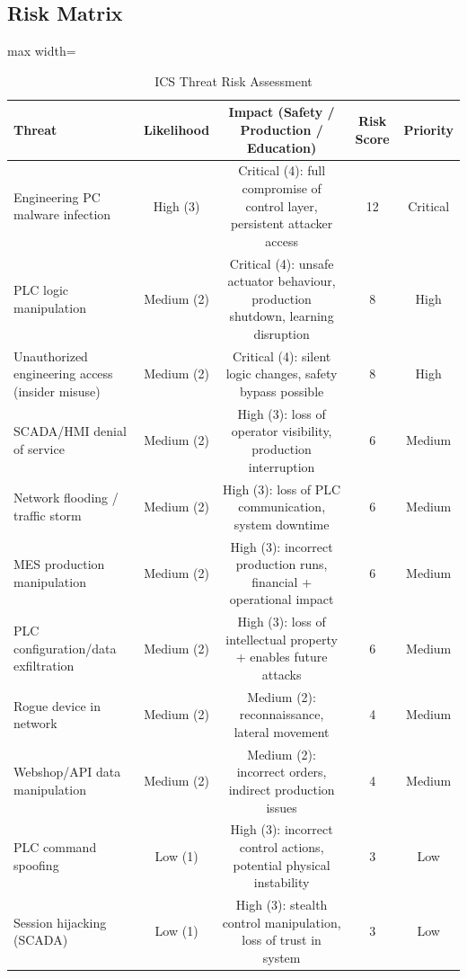 \subsection{Risk Matrix}

\begin{table}[H]
\centering

\begin{adjustbox}{max width=\textwidth}
\begin{tabular}{@{}lcccc@{}}
\toprule
\textbf{Threat} & \textbf{Likelihood} & \textbf{Impact (Safety / Production / Education)} & \textbf{Risk Score} & \textbf{Priority} \\
\midrule
Engineering PC malware infection & High (3) & Critical (4): full compromise of control layer, persistent attacker access & 12 & Critical \\
PLC logic manipulation & Medium (2) & Critical (4): unsafe actuator behaviour, production shutdown, learning disruption & 8 & High \\
Unauthorized engineering access (insider misuse) & Medium (2) & Critical (4): silent logic changes, safety bypass possible & 8 & High \\
SCADA/HMI denial of service & Medium (2) & High (3): loss of operator visibility, production interruption & 6 & Medium \\
Network flooding / traffic storm & Medium (2) & High (3): loss of PLC communication, system downtime & 6 & Medium \\
MES production manipulation & Medium (2) & High (3): incorrect production runs, financial + operational impact & 6 & Medium \\
PLC configuration/data exfiltration & Medium (2) & High (3): loss of intellectual property + enables future attacks & 6 & Medium \\
Rogue device in network & Medium (2) & Medium (2): reconnaissance, lateral movement & 4 & Medium \\
Webshop/API data manipulation & Medium (2) & Medium (2): incorrect orders, indirect production issues & 4 & Medium \\
PLC command spoofing & Low (1) & High (3): incorrect control actions, potential physical instability & 3 & Low \\
Session hijacking (SCADA) & Low (1) & High (3): stealth control manipulation, loss of trust in system & 3 & Low \\
\bottomrule
\end{tabular}
\end{adjustbox}
\caption{ICS Threat Risk Assessment}
\end{table}